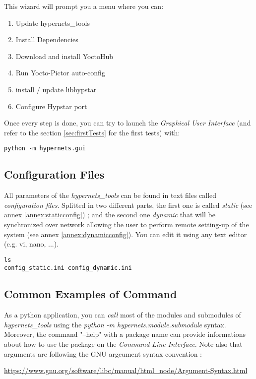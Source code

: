 \noindent  This wizard will prompt you a menu where you can:
\begin{enumerate}
	\item Update hypernets\_tools
	\item Install Dependencies
	\item Download and install YoctoHub
	\item Run Yocto-Pictor auto-config  
	\item install / update libhypstar
	\item Configure Hypstar port
\end{enumerate}

\noindent Once every step is done, you can try to launch the \textit{Graphical User
Interface} (and refer to the section \ref{sec:firstTests} for the first tests) with:
\vspace{-10pt}
\begin{lstlisting}
python -m hypernets.gui
\end{lstlisting}

\subsection{Configuration Files}
All parameters of the \textit{hypernets\_tools} can be found in 
text files called \textit{configuration files}.
Splitted in two different parts, the first one is called
\textit{static} (see annex \ref{annex:staticconfig}) ; and the second one \textit{dynamic} 
that will be synchronized over network allowing the user to perform remote 
setting-up of the system (see annex \ref{annex:dynamicconfig}). You can edit it
using any text editor (e.g. vi, nano, ...). 


\begin{lstlisting}
ls 
config_static.ini config_dynamic.ini
\end{lstlisting}

\subsection{Common Examples of Command}
As a python application, you can \textit{call} most of the modules and
submodules of \textit{hypernets\_tools} using the \textit{python -m
hypernets.module.submodule} syntax.
Moreover, the command "--help" with a package name can provide informations
about how to use the package on the \textit{Command Line Interface}.
Note also that arguments are following the GNU argeument syntax convention : 

\noindent\href{https://www.gnu.org/software/libc/manual/html\_node/Argument-Syntax.html}{https://www.gnu.org/software/libc/manual/html\_node/Argument-Syntax.html}

